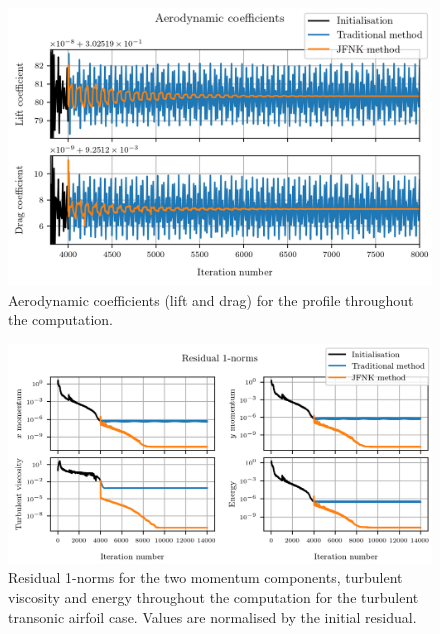         \begin{figure}
          \centering
          \includegraphics{figures/rae_coefficients.png}
          \caption{Aerodynamic coefficients (lift and drag) for the profile throughout the computation.}
          \label{fig:rae_coefficients}
        \end{figure}

        \begin{figure}
          \centering
          \includegraphics{figures/rae_residuals.png}
          \caption{Residual 1-norms for the two momentum components, turbulent viscosity and energy throughout the computation for the turbulent transonic airfoil case.
          Values are normalised by the initial residual.}
          \label{fig:rae_residuals}
        \end{figure}

